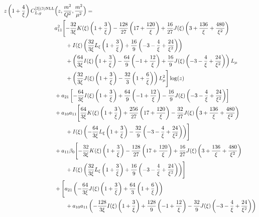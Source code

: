 \documentclass[a4paper]{article}
\begin{document}
\begin{equation}
	\begin{split}
		z \left(1 + \frac{4}{\xi}\right) C_{L,g}^{[3](3) \rm NLL}&\Bigl(z,\frac{m^2}{Q^2},\frac{m^2}{\mu^2}\Bigr)= \\
		& a_{11}^2 \Biggl[ -\frac{32}{3 \xi} K(\xi) \left(1 + \frac{3}{\xi}\right) - \frac{128}{27} \left(17 + \frac{120}{\xi}\right) + \frac{16}{27} J(\xi) \left(3 + \frac{136}{\xi} + \frac{480}{\xi^2}\right) \\
		&\qquad + I(\xi) \left(\frac{32}{3\xi} L_\xi \left(1 + \frac{3}{\xi}\right) + \frac{16}{9} \left(-3 - \frac{4}{\xi} + \frac{24}{\xi^2}\right)\right) \\
	 	& \qquad + \left(\frac{64}{3\xi} I(\xi) \left(1 + \frac{3}{\xi}\right) - \frac{64}{9} \left(-1 + \frac{12}{\xi}\right) + \frac{16}{9} J(\xi) \left(-3 - \frac{4}{\xi} + \frac{24}{\xi^2}\right)\right) L_\mu \\
		& \qquad + \left(\frac{32}{3\xi} J(\xi) \left(1 + \frac{3}{\xi}\right) - \frac{32}{3} \left(1 + \frac{6}{\xi}\right)\right) L_\mu^2\Biggr] \log(z) \\
		& + a_{21} \left[-\frac{64}{3\xi} I(\xi)  \left(1 + \frac{3}{\xi}\right) + \frac{64}{9} \left(-1 + \frac{12}{\xi}\right) - \frac{16}{9} J(\xi) \left(-3 - \frac{4}{\xi} + \frac{24}{\xi^2}\right)\right] \\
		& + a_{10} a_{11} \Biggl[\frac{64}{3\xi} K(\xi) \left(1 + \frac{3}{\xi}\right) + \frac{256}{27} \left(17 + \frac{120}{\xi}\right) - \frac{32}{27} J(\xi) \left(3 + \frac{136}{\xi} + \frac{480}{\xi^2}\right) \\
		& \qquad + I(\xi) \left(-\frac{64}{3\xi} L_\xi \left(1 + \frac{3}{\xi}\right) - \frac{32}{9} \left(-3 - \frac{4}{\xi} + \frac{24}{\xi^2}\right)\right)\Biggr] \\
		& + a_{11} \beta_0 \Biggl[-\frac{32}{3\xi} K(\xi) \left(1 + \frac{3}{\xi}\right) - \frac{128}{27} \left(17 + \frac{120}{\xi}\right) + \frac{16}{27} J(\xi) \left(3 + \frac{136}{\xi} + \frac{480}{\xi^2}\right) \\
		& \qquad+ I(\xi) \left(\frac{32}{3\xi} L_\xi \left(1 + \frac{3}{\xi}\right) + \frac{16}{9} \left(-3 - \frac{4}{\xi} + \frac{24}{\xi^2}\right)\right)\Biggr] \\
		& + \Biggl[a_{21} \left(-\frac{64}{3\xi} J(\xi) \left(1 + \frac{3}{\xi}\right) + \frac{64}{3} \left(1 + \frac{6}{\xi} \right)\right) \\
		& \qquad + a_{10} a_{11} \left(-\frac{128}{3\xi} I(\xi) \left(1 + \frac{3}{\xi}\right) + \frac{128}{9} \left(-1 + \frac{12}{\xi}\right) - \frac{32}{9} J(\xi) \left(-3 - \frac{4}{\xi} + \frac{24}{\xi^2}\right)\right) \\

\end{split}
\end{equation}
\end{document}
